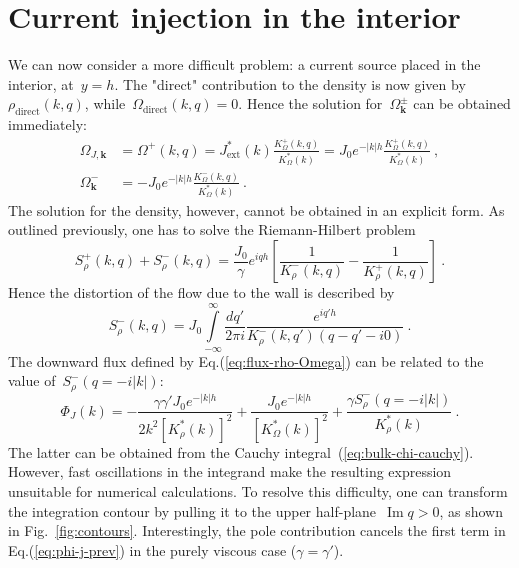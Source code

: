 \documentclass[preprint,aps,eqsecnum]{revtex4-1}
\newcommand{\fplus}[1]{{#1}^{+}}
\newcommand{\fminus}[1]{{#1}^{-}}
\newcommand{\fplusminus}[1]{{#1}^{\pm}}
\renewcommand{\Im}{\mathop{\mathrm{Im}}\nolimits}
\newcommand{\dct}[1]{{#1}_\mathrm{direct}}
\begin{document}
\section{Current injection in the interior}
\label{sec:bulk-src}

We can now consider a more difficult problem: a current source placed
in the interior, at~$y = h$. The "direct" contribution to the density is now given
by~$\dct{\rho}(k, q)$, while~$\dct{\Omega}(k, q) = 0$. Hence the solution
for~$\fplusminus{\Omega}_{\bm k}$ can be obtained immediately:
\begin{align}
\Omega_{J, {\bm k}} &=  \fplus{\Omega}(k, q)
= J_\mathrm{ext}^\ast(k) \frac{\fplus{K}_\Omega(k, q)}{K_\Omega^\ast(k)}
= J_0 e^{-|k|h} \frac{\fplus{K}_\Omega(k, q)}{K_\Omega^\ast(k)}
\ ,
\\
\fminus{\Omega}_{\bm k}
&= - J_0 e^{-|k|h} \frac{\fminus{K}_\Omega(k, q)}{K_\Omega^\ast(k)}
\ .
\end{align}
The solution for the density, however, cannot be obtained in an explicit form.
As outlined previously, one has to solve the Riemann-Hilbert problem
\begin{equation}
  \fplus{S}_\rho(k, q) + \fminus{S}_\rho(k, q) = \frac{J_0}{\gamma} e^{iqh}
  \left[\frac{1}{\fminus{K}_\rho(k, q)} -
  \frac{1}{\fplus{K}_\rho(k, q)} \right]
  \ .
\end{equation}
Hence the distortion of the flow due to the wall is described by
\begin{equation}
  \label{eq:bulk-chi-cauchy}
  \fminus{S}_\rho(k, q) = J_0 \int\limits_{-\infty}^{\infty}
  \frac{dq'}{2\pi i} \frac{e^{iq'h}}{\fminus{K}_\rho(k, q') (q - q' - i0)}
  \ .
\end{equation}
The downward flux defined by Eq.(\ref{eq:flux-rho-Omega}) can be related
to the value of~$\fminus{S}_\rho(q = -i|k|)$:
\begin{equation}
  \label{eq:phi-j-prev}
\Phi_J(k) = - \frac{\gamma \gamma' J_0 e^{-|k|h}}{2k^2 \left[K_\rho^\ast(k)\right]^2}
+ \frac{J_0 e^{-|k|h}}{\left[K_\Omega^\ast(k)\right]^2}
+ \frac{\gamma \fminus{S}_\rho(q=-i|k|)}{K_\rho^\ast(k)}
\ .
\end{equation}
The latter can be obtained from the Cauchy integral~(\ref{eq:bulk-chi-cauchy}).
However, fast oscillations in the integrand make the resulting expression
unsuitable for numerical calculations. To resolve this difficulty, one can
transform the integration contour by pulling it to
the upper half-plane~$\Im q > 0$, as shown in Fig.~\ref{fig:contours}.
Interestingly, the pole contribution cancels the first term in Eq.(\ref{eq:phi-j-prev}) in the purely viscous case ($\gamma = \gamma'$).
\end{document}
